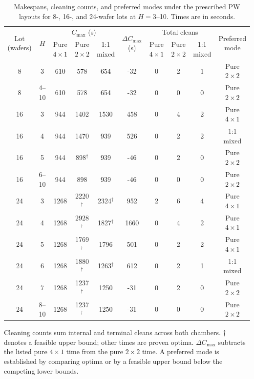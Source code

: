 \documentclass[journal]{IEEEtran}
\begin{document}
\begin{table}[tp]
\centering
\footnotesize
\setlength{\tabcolsep}{3pt}
\caption{Makespans, cleaning counts, and preferred modes under the prescribed PW layouts for 8-, 16-, and 24-wafer lots at $H=3$--10. Times are in seconds.}
\label{tab:clean-crossover-en}
\begin{tabular}{cccccccccc}
\toprule
\multirow{2}{*}{Lot (wafers)} & \multirow{2}{*}{$H$} & \multicolumn{3}{c}{$C_{\max}$ (s)} & \multirow{2}{*}{$\Delta C_{\max}$ (s)} & \multicolumn{3}{c}{Total cleans} & \multirow{2}{*}{Preferred mode}\\
\cmidrule(lr){3-5}\cmidrule(lr){7-9}
 & & Pure $4\times1$ & Pure $2\times2$ & 1:1 mixed & & Pure $4\times1$ & Pure $2\times2$ & 1:1 mixed & \\
\midrule
8 & 3 & 610 & 578 & 654 & -32 & 0 & 2 & 1 & Pure $2\times2$\\
8 & 4--10 & 610 & 578 & 654 & -32 & 0 & 0 & 0 & Pure $2\times2$\\
\midrule
16 & 3 & 944 & 1402 & 1530 & 458 & 0 & 4 & 2 & Pure $4\times1$\\
16 & 4 & 944 & 1470 & 939 & 526 & 0 & 2 & 2 & 1:1 mixed\\
16 & 5 & 944 & 898$^{\dagger}$ & 939 & -46 & 0 & 2 & 0 & Pure $2\times2$\\
16 & 6--10 & 944 & 898 & 939 & -46 & 0 & 0 & 0 & Pure $2\times2$\\
\midrule
24 & 3 & 1268 & 2220$^{\dagger}$ & 2324$^{\dagger}$ & 952 & 2 & 6 & 4 & Pure $4\times1$\\
24 & 4 & 1268 & 2928$^{\dagger}$ & 1827$^{\dagger}$ & 1660 & 0 & 4 & 2 & Pure $4\times1$\\
24 & 5 & 1268 & 1769$^{\dagger}$ & 1796 & 501 & 0 & 2 & 2 & Pure $4\times1$\\
24 & 6 & 1268 & 1880$^{\dagger}$ & 1263$^{\dagger}$ & 612 & 0 & 2 & 1 & 1:1 mixed\\
24 & 7 & 1268 & 1237$^{\dagger}$ & 1250 & -31 & 0 & 2 & 0 & Pure $2\times2$\\
24 & 8--10 & 1268 & 1237$^{\dagger}$ & 1250 & -31 & 0 & 0 & 0 & Pure $2\times2$\\
\bottomrule
\end{tabular}
\par\smallskip
\parbox{0.95\textwidth}{\footnotesize Cleaning counts sum internal and terminal cleans across both chambers. $\dagger$ denotes a feasible upper bound; other times are proven optima. $\Delta C_{\max}$ subtracts the listed pure $4\times1$ time from the pure $2\times2$ time. A preferred mode is established by comparing optima or by a feasible upper bound below the competing lower bounds.}
\end{table}
\end{document}
